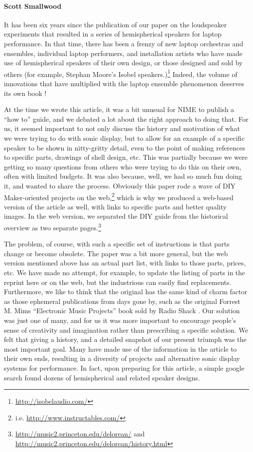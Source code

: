 \paragraph{Scott Smallwood}

It has been six years since the publication of our paper on the loudspeaker experiments that resulted in a series of hemispherical speakers for laptop performance.  In that time, there has been a frenzy of new laptop orchestras and ensembles, individual laptop performers, and installation artists who have made use of hemispherical speakers of their own design, or those designed and sold by others (for example, Stephan Moore's Isobel speakers.)\footnote{\url{http://isobelaudio.com/}}  Indeed, the volume of innovations that have multiplied with the laptop ensemble phenomenon deserves its own book \cite{Bukvic:2010,Hantrakul:2013,Hopson:2014}!

At the time we wrote this article, it was a bit unusual for NIME to publish a ``how to'' guide, and we debated a lot about the right approach to doing that.  For us, it seemed important to not only discuss the history and motivation of what we were trying to do with sonic display, but to allow for an example of a specific speaker to be shown in nitty-gritty detail, even to the point of making references to specific parts, drawings of shell design, etc.  This was partially because we were getting so many questions from others who were trying to do this on their own, often with limited budgets.  It was also because, well, we had so much fun doing it, and wanted to share the process.  Obviously this paper rode a wave of DIY Maker-oriented projects on the web,\footnote{i.e. \url{http://www.instructables.com/}} which is why we produced a web-based version of the article as well, with links to specific parts and better quality images.  In the web version, we separated the DIY guide from the historical overview as two separate pages.\footnote{
\url{http://music2.princeton.edu/delorean/} and \url{http://music2.princeton.edu/delorean/history.html}}


The problem, of course, with such a specific set of instructions is that parts change or become obsolete.  The paper was a bit more general, but the web version mentioned above has an actual part list, with links to those parts, prices, etc.  We have made no attempt, for example, to update the listing of parts in the reprint here or on the web, but the industrious can easily find replacements.  Furthermore, we like to think that the original has the same kind of charm factor as those ephemeral publications from days gone by, such as the original Forrest M. Mims ``Electronic Music Projects'' book sold by Radio Shack \cite{Mims:1977}.  Our solution was just one of many, and for us it was more important to encourage people's sense of creativity and imagination rather than prescribing a specific solution.  We felt that giving a history, and a detailed snapshot of our present triumph was the most important goal.  Many have made use of the information in the article to their own ends, resulting in a diversity of projects and alternative sonic display systems for performance.  In fact, upon preparing for this article, a simple google search found dozens of hemispherical and related speaker designs. 

